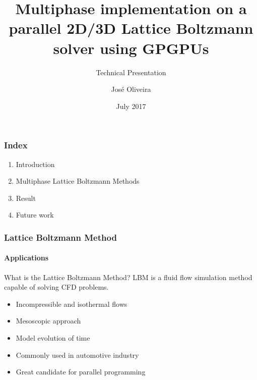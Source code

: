 \documentclass[xcolor=table]{beamer}
\title{Multiphase implementation on a parallel 2D/3D Lattice Boltzmann solver
	using GPGPUs}
\subtitle{Technical Presentation}
\author{José Oliveira}
\institute{Cranfield University\\ School of Aerospace, Transport and Manufacturing}
\date{July 2017}
\begin{document}
	\begin{frame}
		\titlepage
	\end{frame}
	
	\begin{frame}
		\frametitle{Index}
		\begin{enumerate}
			\item Introduction
			\item Multiphase Lattice Boltzmann Methods
			\item Result
			\item Future work
		\end{enumerate}
	\end{frame}
	
	\begin{frame}
		\frametitle{Lattice Boltzmann Method}
		\framesubtitle{Applications}
		\begin{block}{What is the Lattice Boltzmann Method?}
		LBM is a fluid flow simulation method capable of solving CFD problems.
		\end{block}
		\begin{itemize}
			\item Incompressible and isothermal flows
			\item Mesoscopic approach
			\item Model evolution of time
			\item Commonly used in automotive industry
			\item Great candidate for parallel programming
		\end{itemize}
	

	\end{frame}
\end{document}
